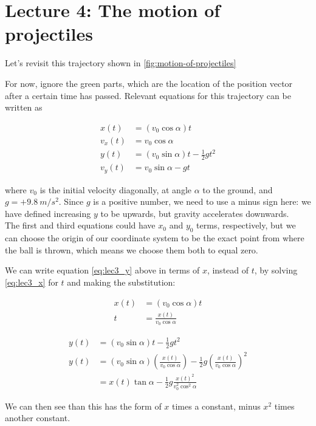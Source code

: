 \section{Lecture 4: The motion of projectiles}

Let's revisit this trajectory shown in \ref{fig:motion-of-projectiles}

For now, ignore the green parts, which are the location of the position vector after a certain time has passed.
Relevant equations for this trajectory can be written as

\begin{align}
x(t) &= (v_0 \cos \alpha) t \label{eq:lec3_x}\\
v_x(t) &= v_0 \cos \alpha\\
y(t) &= (v_0 \sin \alpha) t - \frac{1}{2} g t^2 \label{eq:lec3_y}\\
v_y(t) &= v_0 \sin \alpha - g t
\end{align}

where $v_0$ is the initial velocity diagonally, at angle $\alpha$ to the ground, and $g = +\SI{9.8}{m/s^2}$. Since $g$ is a positive number, we need to use a minus sign here: we have defined increasing $y$ to be upwards, but gravity accelerates downwards.\\
The first and third equations could have $x_0$ and $y_0$ terms, respectively, but we can choose the origin of our coordinate system to be the exact point from where the ball is thrown, which means we choose them both to equal zero.

We can write equation \eqref{eq:lec3_y} above in terms of $x$, instead of $t$, by solving \eqref{eq:lec3_x} for $t$ and making the substitution:

\begin{align}
x(t) &= (v_0 \cos \alpha) t\\
t &= \frac{x(t)}{v_0 \cos \alpha}
\end{align}

\begin{align}
y(t) &= (v_0 \sin \alpha) t - \frac{1}{2} g t^2\\
y(t) &= (v_0 \sin \alpha) \left(\frac{x(t)}{v_0 \cos \alpha}\right) - \frac{1}{2} g \left(\frac{x(t)}{v_0 \cos \alpha}\right)^2\\
     &= x(t) \tan \alpha - \frac{1}{2} g \frac{x(t)^2}{v_0^2 \cos^2 \alpha}
\end{align}

We can then see than this has the form of $x$ times a constant, minus $x^2$ times another constant.


